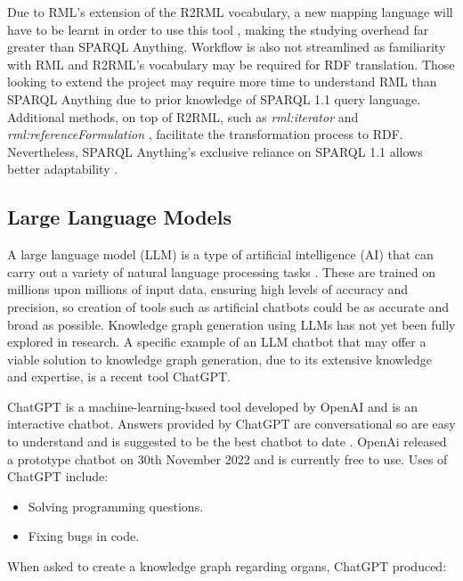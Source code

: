 Due to RML's extension of the R2RML vocabulary, a new mapping language will have to be learnt in order to use this tool \cite{sparqlanything}, making the studying overhead far greater than SPARQL Anything. Workflow is also not streamlined as familiarity with RML and R2RML's vocabulary may be required for RDF translation. Those looking to extend the project may require more time to understand RML than SPARQL Anything due to prior knowledge of SPARQL 1.1 query language. Additional methods, on top of R2RML, such as \textit{rml:iterator} and \textit{rml:referenceFormulation} \cite{dimou2014rml}, facilitate the transformation process to RDF. Nevertheless, SPARQL Anything's exclusive reliance on SPARQL 1.1 allows better adaptability \cite{sparqlanything}.  

\subsection{Large Language Models}
\hspace{0.5cm} A large language model (LLM) is a type of artificial intelligence (AI) that can carry out a variety of natural language processing tasks \cite{rouse_2023}. These are trained on millions upon millions of input data, ensuring high levels of accuracy and precision, so creation of tools such as artificial chatbots could be as accurate and broad as possible. Knowledge graph generation using LLMs has not yet been fully explored in research. A specific example of an LLM chatbot that may offer a viable solution to knowledge graph generation, due to its extensive knowledge and expertise, is a recent tool ChatGPT. 

ChatGPT is a machine-learning-based tool developed by OpenAI and is an interactive chatbot. Answers provided by ChatGPT are conversational so are easy to understand and is suggested to be the best chatbot to date \cite{chatgpt}. OpenAi released a prototype chatbot on 30th November 2022 and is currently free to use. Uses of ChatGPT include:

\vspace{-0.15cm}
\begin{itemize}
    \itemsep0em 
\item Solving programming questions.
\vspace{-0.1cm}
\item Fixing bugs in code.
\end{itemize}
\vspace{-0.15cm}

\noindent When asked to create a knowledge graph regarding organs, ChatGPT produced:

